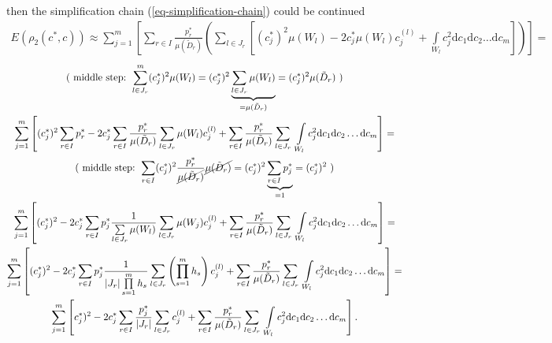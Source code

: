 \documentclass[11pt,a4paper]{article}
\numberwithin{equation}{subsection}
\begin{document}
then the simplification chain (\ref{eq-simplification-chain}) could be continued
\begin{gather}
\nonumber
E(\rho_{2}(c^{*},c)) \approx \sum\limits_{j=1}^{m}  \left[ \sum\limits_{r \in I} \frac{p_{r}^{*}}{\mu(\tilde{D}_{r})} \left( \sum\limits_{l \in J_{r}} \left[ (c_{j}^{*})^{2} \mu(W_{l}) - 2c_{j}^{*} \mu(W_{l}) c_{j}^{(l)} + \int\limits_{W_{l}} c_{j}^{2} \mathrm{d}c_{1} \mathrm{d}c_{2} \dots \mathrm{d}c_{m} \right] \right) \right] = 
\end{gather}
\begin{gather}
\nonumber
\text{( middle step: } \sum_{l \in J_{r}}^{m}(c_{j}^{*})^{2} \mu(W_{l}) = (c_{j}^{*})^{2} \underbrace{\sum_{l \in J_{r}} \mu(W_{l})}_{=\mu(\tilde{D}_{r})} = (c_{j}^{*})^{2} \mu(\tilde{D}_{r}) \text{ )} \\
\nonumber
\sum\limits_{j=1}^{m} \left[  (c_{j}^{*})^{2}  \sum\limits_{r \in I} p_{r}^{*}  - 2c_{j}^{*}  \sum\limits_{r \in I} \frac{p_{r}^{*}}{\mu(\tilde{D}_{r})} \sum\limits_{l \in J_{r}} \mu(W_{l})  c_{j}^{(l)}  + \sum\limits_{r \in I} \frac{p_{r}^{*}}{\mu(\tilde{D}_{r})} \sum\limits_{l \in J_{r}} \ \int\limits_{W_{l}} c_{j}^{2}  \mathrm{d}c_{1} \mathrm{d}c_{2} \dots \mathrm{d}c_{m} \right] = \\
\nonumber
\text{( middle step: } \sum_{r \in I} (c_{j}^{*})^{2} \frac{p_{r}^{*}}{\cancel{\mu(\tilde{D}_{r})}} \cancel{\mu(\tilde{D}_{r})} = (c_{j}^{*})^{2} \underbrace{\sum_{r \in I} p_{j}^{*}}_{=1} = (c_{j}^{*})^{2} \text{ )}\\
\nonumber
\sum\limits_{j=1}^{m} \left[  (c_{j}^{*})^{2} - 2c_{j}^{*} \sum\limits_{r \in I} p_{j}^{*} \frac{1}{\sum\limits_{l \in J_{r}} \mu(W_{l})} \sum\limits_{l \in J_{r}} \mu(W_{j}) c_{j}^{(l)} +  \sum\limits_{r \in I} \frac{p_{r}^{*}}{\mu(\tilde{D}_{r})} \sum\limits_{l \in J_{r}} \ \int\limits_{W_{l}} c_{j}^{2}  \mathrm{d}c_{1} \mathrm{d}c_{2} \dots \mathrm{d}c_{m} \right] = \\
\nonumber
\sum\limits_{j=1}^{m}  \left[    (c_{j}^{*})^{2} - 2c_{j}^{*} \sum\limits_{r \in I} p_{j}^{*} \frac{1}{\left| J_{r} \right| \prod\limits_{s=1}^{m} h_{s}} \sum\limits_{l \in J_{r}} \left( \prod_{s=1}^{m} h_{s} \right) c_{j}^{(l)} +  \sum\limits_{r \in I} \frac{p_{r}^{*}}{\mu(\tilde{D}_{r})} \sum\limits_{l \in J_{r}} \ \int\limits_{W_{l}} c_{j}^{2}  \mathrm{d}c_{1} \mathrm{d}c_{2} \dots \mathrm{d}c_{m} \right] = \\
\sum\limits_{j=1}^{m} \left[ c_{j}^{*})^{2} - 2c_{j}^{*} \sum\limits_{r \in I} \frac{p_{j}^{*}}{ \left| J_{r} \right|} \sum\limits_{l \in J_{r}} c_{j}^{(l)} + \sum\limits_{r \in I} \frac{p_{r}^{*}}{\mu(\tilde{D}_{r})} \sum\limits_{l \in J_{r}} \ \int\limits_{W_{l}} c_{j}^{2}  \mathrm{d}c_{1} \mathrm{d}c_{2} \dots \mathrm{d}c_{m} \right]. \label{eq-final-simplification}
\end{gather}
\end{document}
